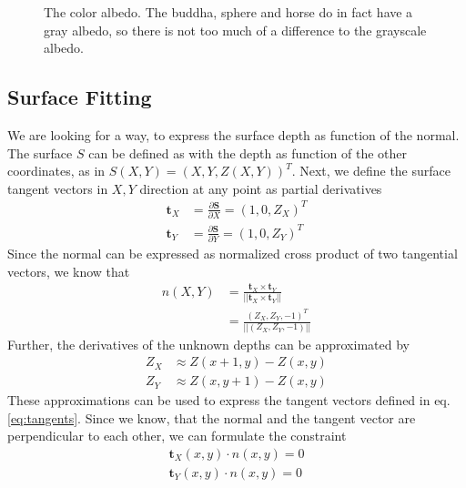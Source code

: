 \documentclass{paper}
\begin{document}
\begin{figure}[h!]
\begin{subfigure}{0.3\textwidth}
        \end{subfigure}
        \caption{The color albedo. The buddha, sphere and horse
        do in fact have a gray albedo, so there is not too much
        of a difference to the grayscale albedo.}
        \label{fig:color_albedo}
\end{figure}

\subsection{Surface Fitting}

We are looking for a way, to express the surface depth as function of the normal. The surface $S$ can be defined as with the depth as function of the other 
coordinates, as in $S(X,Y)=(X,Y,Z(X,Y))^T$. Next, we define the surface tangent
vectors in $X, Y$ direction at any point as partial derivatives
\begin{equation}
\begin{aligned}
	\textbf{t}_X &= \frac{\partial\textbf{S}}{\partial X} = (1, 0, Z_X)^T \\
	\textbf{t}_Y &= \frac{\partial\textbf{S}}{\partial Y} = (1, 0, Z_Y)^T
\end{aligned}
\label{eq:tangents}
\end{equation}
Since the normal can be expressed as normalized cross product of two tangential vectors, we know that
\begin{equation}
\begin{aligned}
	n(X,Y) &= \frac{\textbf{t}_X \times \textbf{t}_Y}
					{||\textbf{t}_X \times \textbf{t}_Y||} \\
		   &= \frac{(Z_X, Z_Y, -1)^T}{||(Z_X, Z_Y, -1)||}
\end{aligned}
\end{equation}
Further, the derivatives of the unknown depths can be approximated by
\begin{equation}
\begin{aligned}
	Z_X &\approx Z(x + 1, y) - Z(x,y) \\
	Z_Y &\approx Z(x, y + 1) - Z(x,y)	
\end{aligned}
\label{eq:approx}
\end{equation}
These approximations can be used to express the tangent vectors 
defined in eq. \ref{eq:tangents}. Since we know, that the normal and the tangent vector are perpendicular to each other, we can
formulate the constraint
\begin{equation}
\begin{aligned}
	\textbf{t}_X(x,y) \cdot n(x,y) = 0 \\
	\textbf{t}_Y(x,y) \cdot n(x,y) = 0
\end{aligned}
\end{equation}
\end{document}
